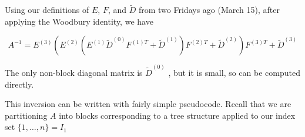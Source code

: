 \begin{center}
\end{center}


Using our definitions of $E$, $F$, and $\widetilde{D}$ from two Fridays ago (March 15), after applying the Woodbury identity, we have

\begin{equation*}
    A^{-1} = E^{(3)}
    \left(
        E^{(2)}
        \left(
            E^{(1)} \widetilde{D}^{(0)} F^{(1)T}
            + \widetilde{D}^{(1)}
        \right) F^{(2)T} + \widetilde{D}^{(2)}
    \right) F^{(3)T} + \widetilde{D}^{(3)}
\end{equation*}

The only non-block diagonal matrix is $\widetilde{D}^{(0)}$
, but it is small, so can be computed directly.

This inversion can be written with fairly simple pseudocode. Recall that we are partitioning $A$ into blocks corresponding to a tree structure applied to our index set $\{ 1, \ldots, n \} = I_1$


